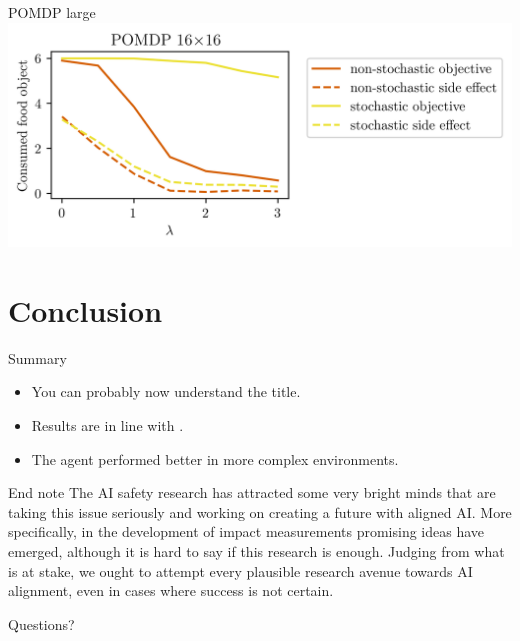 \documentclass[10pt]{beamer}
\begin{document}
\begin{frame}{POMDP large}
  \centering
  \includegraphics[scale=0.8]{"./figures/pomdp_16x16_result_plot.png"}
\end{frame}


\section{Conclusion}

\begin{frame}{Summary}
  \begin{itemize}[<+- | alert@+>]
      \item You can probably now understand the title.
      \item Results are in line with \citet{ArmstrongLevinstein}.
      \item The agent performed better in more complex environments.
  \end{itemize}
\end{frame}

\begin{frame}{End note}
The AI safety research has attracted some very bright minds that are taking this issue seriously and working on creating a future with aligned AI. More specifically, in the development of impact measurements promising ideas have emerged, although it is hard to say if this research is enough. Judging from what is at stake, we ought to attempt every plausible research avenue towards AI alignment, even in cases where success is not certain.
\end{frame}

{
\begin{frame}[standout]
  Questions?
\end{frame}
}



\end{document}
